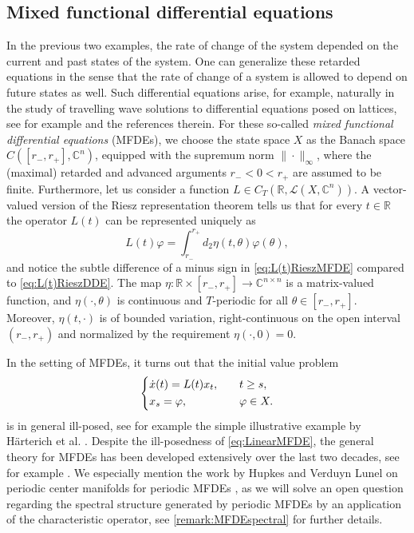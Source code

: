 \documentclass[english]{myarticle}
\begin{document}
\begin{sloppypar}
\subsection{Mixed functional differential equations} \label{subsec:MFDEs}

In the previous two examples, the rate of change of the system depended on the current and past states of the system. One can generalize these retarded equations in the sense that the rate of change of a system is allowed to depend on future states as well. Such differential equations arise, for example, naturally in the study of travelling wave solutions to differential equations posed on lattices, see for example \cite{Hupkes2012,Hupkes2010,Wu1997} and the references therein. For these so-called \emph{mixed functional differential equations} (MFDEs), we choose the state space $X$ as the Banach space $C([r_{-},r_{+}],\mathbb{C}^n)$, equipped with the supremum norm $\| \cdot \|_\infty$, where the (maximal) retarded and advanced arguments $r_{-} < 0 < r_{+}$ are assumed to be finite. Furthermore, let us consider a function $L \in C_T(\mathbb{R}, \mathcal{L}(X,\mathbb{C}^n))$. A vector-valued version of the Riesz representation theorem tells us that for every $t \in \mathbb{R}$ the operator $L(t)$ can be represented uniquely as
\begin{equation} \label{eq:L(t)RieszMFDE}
    L(t)\varphi = \int_{r_{-}}^{r_{+}} d_2 \eta(t,\theta) \varphi(\theta),
\end{equation}
and notice the subtle difference of a minus sign in \eqref{eq:L(t)RieszMFDE} compared to \eqref{eq:L(t)RieszDDE}. The map $\eta : \mathbb{R} \times [r_{-},r_{+}] \to \mathbb{C}^{n \times n}$ is a matrix-valued function, and $\eta(\cdot,\theta)$ is continuous and $T$-periodic for all $\theta \in [r_{-},r_{+}]$. Moreover, $\eta(t,\cdot)$ is of bounded variation, right-continuous on the open interval $(r_{-},r_{+})$ and normalized by the requirement $\eta(\cdot,0) = 0$.

In the setting of MFDEs, it turns out that the initial value problem
\begin{equation} \label{eq:LinearMFDE}
    \begin{dcases}
    \dot{x}(t) = L(t)x_t, \quad &t \geq s, \\
    x_s = \varphi, \quad &\varphi \in X.   
    \end{dcases}    
\end{equation}
is in general ill-posed, see for example the simple illustrative example by H\"arterich et al. \cite{Harterich2002}. Despite the ill-posedness of \eqref{eq:LinearMFDE}, the general theory for MFDEs has been developed extensively over the last two decades, see for example \cite{MalletParet1999,MALLETPARET2005,Rustichini1989,Hupkes2006}. We especially mention the work by Hupkes and Verduyn Lunel on periodic center manifolds for periodic MFDEs \cite{Hupkes2008}, as we will solve an open question regarding the spectral structure generated by periodic MFDEs by an application of the characteristic operator, see \cref{remark:MFDEspectral} for further details.


\end{sloppypar}
\end{document}
